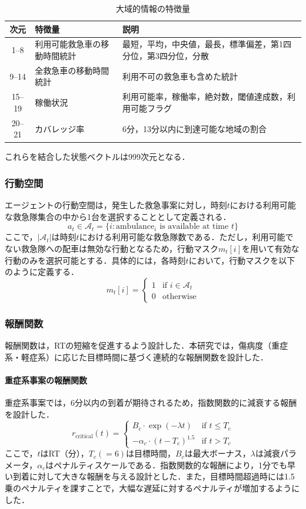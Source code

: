 \begin{table}[H]
\centering
\caption{大域的情報の特徴量}
\label{tab:global_features}
\begin{tabularx}{\linewidth}{clX}
\hline
次元 & 特徴量 & 説明 \\
\hline
1--8 & 利用可能救急車の移動時間統計 & 最短，平均，中央値，最長，標準偏差，第1四分位，第3四分位，分散 \\
9--14 & 全救急車の移動時間統計 & 利用不可の救急車も含めた統計 \\
15--19 & 稼働状況 & 利用可能率，稼働率，絶対数，閾値達成数，利用可能フラグ \\
20--21 & カバレッジ率 & 6分，13分以内に到達可能な地域の割合 \\
\hline
\end{tabularx}
\end{table}

これらを結合した状態ベクトルは999次元となる．


\subsubsection{行動空間}
エージェントの行動空間は，発生した救急事案に対し，時刻$t$における利用可能な救急隊集合の中から1台を選択することとして定義される．
\[
a_t \in \mathcal{A}_t = \{i : \text{ambulance}_i \text{ is available at time } t\}
\]
ここで，$|\mathcal{A}_t|$は時刻$t$における利用可能な救急隊数である．ただし，利用可能でない救急隊への配車は無効な行動となるため，行動マスク$m_t[i]$を用いて有効な行動のみを選択可能とする．具体的には，各時刻$t$において，行動マスクを以下のように定義する．
\[
  m_t[i] =
  \begin{cases}
    1 & \text{if } i \in \mathcal{A}_t \\
    0 & \text{otherwise}
  \end{cases}
\]


\subsubsection{報酬関数}
報酬関数は，RTの短縮を促進するよう設計した．本研究では，傷病度（重症系・軽症系）に応じた目標時間に基づく連続的な報酬関数を設計した．

\paragraph{重症系事案の報酬関数}

重症系事案では，6分以内の到着が期待されるため，指数関数的に減衰する報酬を設計した．
\[
r_{\text{critical}}(t) = 
\begin{cases} 
B_c \cdot \exp(-\lambda t) & \text{if } t \leq T_c \\ 
-\alpha_c \cdot (t - T_c)^{1.5} & \text{if } t > T_c 
\end{cases}
\]
ここで，$t$はRT（分），$T_c(=6)$は目標時間，$B_c$は最大ボーナス，$\lambda$は減衰パラメータ，$\alpha_c$はペナルティスケールである．指数関数的な報酬により，1分でも早い到着に対して大きな報酬を与える設計とした．また，目標時間超過時には1.5乗のペナルティを課すことで，大幅な遅延に対するペナルティが増加するようにした．

